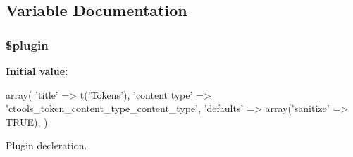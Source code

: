 \subsection{Variable Documentation}
\hypertarget{profiles_2dosomething_2modules_2contrib_2ctools_2plugins_2content__types_2token_2token_8inc_ada8a7130088351710bb02ed622d6bf65}{
\subsubsection[{\$plugin}]{\setlength{\rightskip}{0pt plus 5cm}\$plugin}}
\label{profiles_2dosomething_2modules_2contrib_2ctools_2plugins_2content__types_2token_2token_8inc_ada8a7130088351710bb02ed622d6bf65}
{\bfseries Initial value:}
\begin{DoxyCode}
 array(
  'title' => t('Tokens'),
  'content type' => 'ctools_token_content_type_content_type',
  'defaults' => array('sanitize' => TRUE),
)
\end{DoxyCode}
Plugin decleration. 